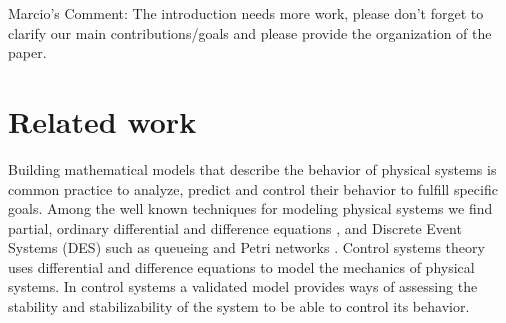\documentclass{aamas2016}
\begin{document}
{\color{red} Marcio's Comment: The introduction needs more work, please don't forget to clarify our main contributions/goals and please 
provide the organization of the paper.}







\section{Related work}

Building mathematical models that describe the behavior of physical systems is common practice to analyze, predict and 
control their behavior to fulfill specific goals. Among the well known techniques for modeling physical systems we find partial, ordinary
differential and difference equations \cite{Khalil-2002,Nise-2010}, and Discrete Event Systems (DES) such as queueing and Petri networks 
\cite{Cassandras-2008,Luna-2015,Urgaonkar-2007}.
Control systems theory uses differential and difference equations to model the mechanics of physical systems. In control systems
a validated model provides ways of assessing the stability and stabilizability of the system to be able to control its behavior.
\end{document}
